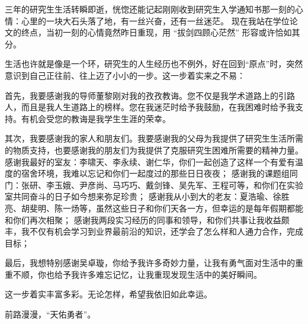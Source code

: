 \cleardoublepage
{}

三年的研究生生活转瞬即逝，恍惚还能记起刚刚收到研究生入学通知书那一刻的心情：心里的一块大石头落了地，有一丝兴奋，还有一丝迷茫。
现在我站在学位论文的终点，当初一刻的心情竟然昨日重现，用 “拔剑四顾心茫然” 形容或许恰如其分。

生活也许就是像是一个环，研究生的人生经历也不例外，好在回到“原点”时，突然意识到自己正往前、往上迈了小小的一步。这一步着实来之不易：

首先，我要感谢我的导师董黎刚对我的孜孜教诲。您不仅是我学术道路上的引路人，而且是我人生道路上的榜样。您在我迷茫时给予我鼓励，在我困难时给予我支持。有机会受您的教诲是我学生生涯的荣幸。

其次，我要感谢我的家人和朋友们。我要感谢我的父母为我提供了研究生生活所需的物质支持，也要感谢我的朋友们为我提供了克服研究生困难所需要的精神力量。
感谢我最好的室友：李啸天、李永续、谢仁华，你们一起创造了这样一个有爱有温度的宿舍环境，我难以忘记和你们一起度过的那些日日夜夜；
感谢我的课题组同门：张研、李玉娥、尹彦尚、马巧巧、戴剑锋、吴先军、王程可等，和你们在实验室共同奋斗的日子如今想来弥足珍贵；
感谢我从小到大的老友：夏浩瑜、徐胜亮、胡斐明、陈一炀等，虽然这些日子和你们天各一方，但幸运的是每年假期都能和你们再次相聚；
感谢我两段实习经历的同事和领导，和你们共事让我收益颇丰，我不仅有机会学习到业界最前沿的知识，还学会了怎么样和人通力合作，完成目标；

最后，我想特别感谢吴卓璇，你给予我许多奇妙力量，让我有勇气面对生活中的重重不顺，你也给予我许多难忘记忆，让我重现发现生活中的美好瞬间。

这一步着实丰富多彩。无论怎样，希望我依旧如此幸运。

前路漫漫，“天佑勇者”。


\newpage